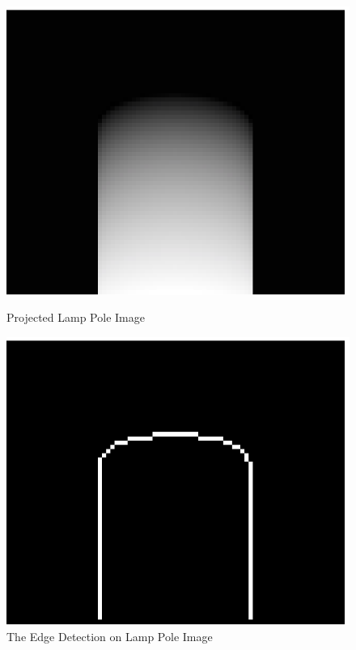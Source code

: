 \documentclass{cdcarta4}
\begin{document}
\begin{figure}[!htb]
    \begin{minipage}[t]{0.23\textwidth}
       \centering\includegraphics[width=\textwidth]{img/PoleFitImg}
       \caption{Projected Lamp Pole Image} \label{fig:polefitimg} 
    \end{minipage} %
    \begin{minipage}[t]{0.23\textwidth}
        \centering\includegraphics[width=\textwidth]{img/PoleFitEdge}
        \caption{The Edge Detection on Lamp Pole Image} \label{fig:polefitedge}
    \end{minipage}
\end{figure}
\end{document}
